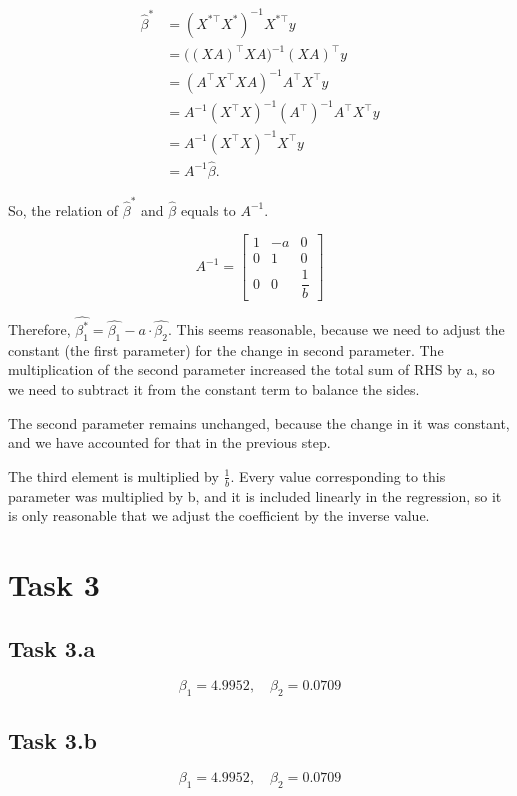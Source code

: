 \documentclass[12pt]{article}
\begin{document}
\[
\begin{aligned}
\hat{\beta}^*
&= (X^{*\top} X^*)^{-1} X^{*\top} y \\[4pt]
&= \big((X A)^{\top} X A\big)^{-1} (X A)^{\top} y \\[4pt]
&= (A^{\top} X^{\top} X A)^{-1} A^{\top} X^{\top} y \\[4pt]
&= A^{-1} (X^{\top} X)^{-1} (A^{\top})^{-1} A^{\top} X^{\top} y \\[4pt]
&= A^{-1} (X^{\top} X)^{-1} X^{\top} y
\\[4pt]
&= A^{-1} \hat{\beta}.
\end{aligned}
\]

So, the relation of $\hat{\beta}^*$ and $\hat{\beta}$ equals to $A^{-1}$.

\[
A^{-1} =
\begin{bmatrix}
1 & -a & 0 \\[4pt]
0 & 1 & 0 \\[4pt]
0 & 0 & \dfrac{1}{b}
\end{bmatrix}
\]

Therefore, $\hat{\beta_1^*} = \hat{\beta_1} - a\cdot \hat{\beta_2}$. This seems reasonable, because we need to adjust the constant (the first parameter) for the change in second parameter. The multiplication of the second parameter increased the total sum of RHS by a, so we need to subtract it from the constant term to balance the sides.

The second parameter remains unchanged, because the change in it was constant, and we have accounted for that in the previous step.

The third element is multiplied by $\frac{1}{b}$. Every value corresponding to this parameter was multiplied by b, and it is included linearly in the regression, so it is only reasonable that we adjust the coefficient by the inverse value.


\section*{Task 3}

\subsection*{Task 3.a}

\[
\beta_1 = 4.9952, \quad \beta_2 = 0.0709
\]


\subsection*{Task 3.b}

\[
\beta_1 = 4.9952, \quad \beta_2 = 0.0709
\]
\end{document}

